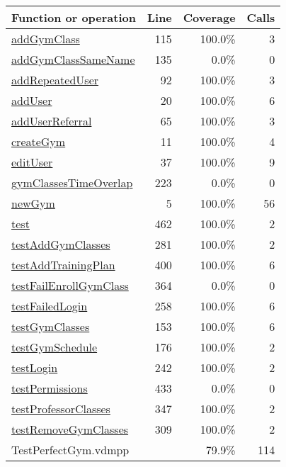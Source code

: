 \begin{longtable}{|l|r|r|r|}
\hline
Function or operation & Line & Coverage & Calls \\
\hline
\hline
\hyperref[addGymClass:115]{addGymClass} & 115&100.0\% & 3 \\
\hline
\hyperref[addGymClassSameName:135]{addGymClassSameName} & 135&0.0\% & 0 \\
\hline
\hyperref[addRepeatedUser:92]{addRepeatedUser} & 92&100.0\% & 3 \\
\hline
\hyperref[addUser:20]{addUser} & 20&100.0\% & 6 \\
\hline
\hyperref[addUserReferral:65]{addUserReferral} & 65&100.0\% & 3 \\
\hline
\hyperref[createGym:11]{createGym} & 11&100.0\% & 4 \\
\hline
\hyperref[editUser:37]{editUser} & 37&100.0\% & 9 \\
\hline
\hyperref[gymClassesTimeOverlap:223]{gymClassesTimeOverlap} & 223&0.0\% & 0 \\
\hline
\hyperref[newGym:5]{newGym} & 5&100.0\% & 56 \\
\hline
\hyperref[test:462]{test} & 462&100.0\% & 2 \\
\hline
\hyperref[testAddGymClasses:281]{testAddGymClasses} & 281&100.0\% & 2 \\
\hline
\hyperref[testAddTrainingPlan:400]{testAddTrainingPlan} & 400&100.0\% & 6 \\
\hline
\hyperref[testFailEnrollGymClass:364]{testFailEnrollGymClass} & 364&0.0\% & 0 \\
\hline
\hyperref[testFailedLogin:258]{testFailedLogin} & 258&100.0\% & 6 \\
\hline
\hyperref[testGymClasses:153]{testGymClasses} & 153&100.0\% & 6 \\
\hline
\hyperref[testGymSchedule:176]{testGymSchedule} & 176&100.0\% & 2 \\
\hline
\hyperref[testLogin:242]{testLogin} & 242&100.0\% & 2 \\
\hline
\hyperref[testPermissions:433]{testPermissions} & 433&0.0\% & 0 \\
\hline
\hyperref[testProfessorClasses:347]{testProfessorClasses} & 347&100.0\% & 2 \\
\hline
\hyperref[testRemoveGymClasses:309]{testRemoveGymClasses} & 309&100.0\% & 2 \\
\hline
\hline
TestPerfectGym.vdmpp & & 79.9\% & 114 \\
\hline
\end{longtable}

